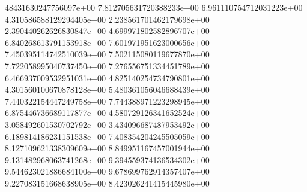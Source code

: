 48431630247756097e+00	7.812705631720388233e+00	6.961110754712031223e+00	4.310586588129294405e+00	2.238561701462179698e+00	2.390440262626830847e+00	4.699971802582896707e+00	6.840268613791153918e+00	7.601971951623000656e+00	7.450395114742510039e+00	7.502115080119677870e+00	7.722058995040737450e+00	7.276556751334451789e+00	6.466937009532951031e+00	4.825140254734790801e+00	4.301560100670878128e+00	5.480361056046688439e+00	7.440322154447249758e+00	7.744388971223298945e+00	6.875446736689117877e+00	4.580729126341652524e+00	3.058492601530702792e+00	3.434096687487953492e+00	6.189814186231151538e+00	7.408354204245505059e+00	8.127109621338309609e+00	8.849951167457001944e+00	9.131482968063741268e+00	9.394559374136534302e+00	9.544623021886684100e+00	9.678699762914357407e+00	9.227083151668638905e+00	8.423026241415445980e+00
